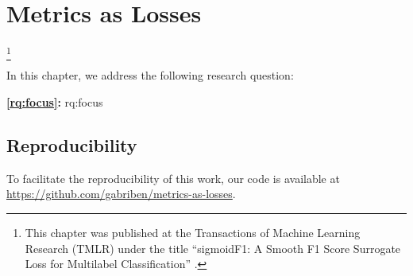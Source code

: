 
\chapter{Metrics as Losses}
\label{chapter:sigmoidf1}

\footnote[]{This chapter was published at the Transactions of Machine Learning Research (TMLR) under the title ``sigmoidF1: A Smooth F1 Score Surrogate Loss for Multilabel Classification'' \citep{sigmoidf1}.}
\acresetall

In this chapter, we address the following research question:

\medskip
\noindent
\textbf{\ref{rq:focus}:} \acl{rq:focus}
\medskip

\noindent

%
%
%
%
%
%
%
%

\section*{Reproducibility}
To facilitate the reproducibility of this work, our code is available at \url{https://github.com/gabriben/metrics-as-losses}.





